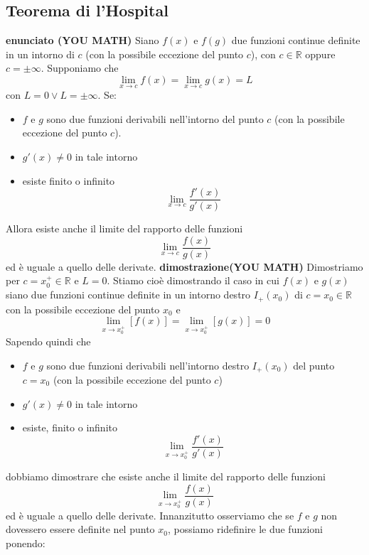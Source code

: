 \documentclass[a4paper, 9pt]{report}
\begin{document}
\subsection*{Teorema di l'Hospital}
\textbf{enunciato (YOU MATH)} \newline
Siano $f(x)$ e $f(g)$ due funzioni continue definite in un intorno di $c$ (con la possibile eccezione del punto $c$), con $c \in \mathbb{R}$ oppure $c = \pm \infty$. Supponiamo che
\[
    \lim_{x\rightarrow c}f(x) = \lim_{x\rightarrow c} g(x) = L
\]
con $L = 0 \lor L = \pm \infty$.\newline
Se:
\begin{itemize}
    \item $f$ e $g$ sono due funzioni derivabili nell'intorno del punto $c$ (con la possibile eccezione del punto $c$).
    \item $g'(x) \neq 0$ in tale intorno
    \item esiste finito o infinito
    \[
        \lim_{x\rightarrow c} \frac{f'(x)}{g'(x)}
    \]
\end{itemize}
Allora esiste anche il limite del rapporto delle funzioni
\[
    \lim_{x\rightarrow c} \frac{f(x)}{g(x)}
\]
ed è uguale a quello delle derivate.\newline
\newline
\textbf{dimostrazione(YOU MATH)}\newline
Dimostriamo per $c = x_0^+  \in \mathbb{R}$ e $L = 0$.\newline
Stiamo cioè dimostrando il caso in cui $f(x)$ e $g(x)$ siano due funzioni continue definite in un intorno destro $I_+(x_0)$ di $c = x_0 \in \mathbb{R}$ con la possibile eccezione del punto $x_0$ e 
\[
    \lim_{x\rightarrow x_0^+} [f(x)] = \lim_{x\rightarrow x_0^+} [g(x)] = 0
\]
Sapendo quindi che
\begin{itemize}
    \item $f$ e $g$ sono due funzioni derivabili nell'intorno destro $I_+(x_0)$ del punto $c= x_0$ (con la possibile eccezione del punto $c$)
    \item $g'(x) \neq 0$ in tale intorno
    \item esiste, finito o infinito
        \[
            \lim_{x\rightarrow x_0^+}\frac{f'(x)}{g'(x)}
        \]
\end{itemize}
dobbiamo dimostrare che esiste anche il limite del rapporto delle funzioni
\[
    \lim_{x\rightarrow x_0^+} \frac{f(x)}{g(x)}
\]
ed è uguale a quello delle derivate.\newline
Innanzitutto osserviamo che se $f$ e $g$ non dovessero essere definite nel punto $x_0$, possiamo ridefinire le due funzioni ponendo:
\end{document}

